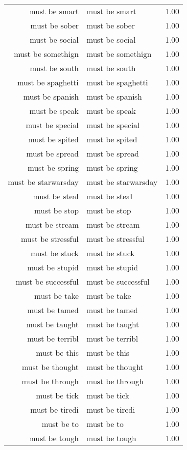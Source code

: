 \begin{table}[ht]
\begin{tabular}{rlr}
  must be smart & must be smart & 1.00 \\ 
  must be sober & must be sober & 1.00 \\ 
  must be social & must be social & 1.00 \\ 
  must be somethign & must be somethign & 1.00 \\ 
  must be south & must be south & 1.00 \\ 
  must be spaghetti & must be spaghetti & 1.00 \\ 
  must be spanish & must be spanish & 1.00 \\ 
  must be speak & must be speak & 1.00 \\ 
  must be special & must be special & 1.00 \\ 
  must be spited & must be spited & 1.00 \\ 
  must be spread & must be spread & 1.00 \\ 
  must be spring & must be spring & 1.00 \\ 
  must be starwarsday & must be starwarsday & 1.00 \\ 
  must be steal & must be steal & 1.00 \\ 
  must be stop & must be stop & 1.00 \\ 
  must be stream & must be stream & 1.00 \\ 
  must be stressful & must be stressful & 1.00 \\ 
  must be stuck & must be stuck & 1.00 \\ 
  must be stupid & must be stupid & 1.00 \\ 
  must be successful & must be successful & 1.00 \\ 
  must be take & must be take & 1.00 \\ 
  must be tamed & must be tamed & 1.00 \\ 
  must be taught & must be taught & 1.00 \\ 
  must be terribl & must be terribl & 1.00 \\ 
  must be this & must be this & 1.00 \\ 
  must be thought & must be thought & 1.00 \\ 
  must be through & must be through & 1.00 \\ 
  must be tick & must be tick & 1.00 \\ 
  must be tiredi & must be tiredi & 1.00 \\ 
  must be to & must be to & 1.00 \\ 
  must be tough & must be tough & 1.00 \\ 

\end{tabular}
\end{table}
